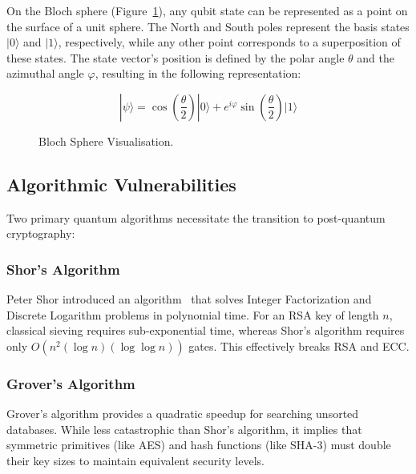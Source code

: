 On the Bloch sphere (Figure~\ref{fig:bloch_sphere_visualisation}), any qubit state can be represented as a point on the surface of a unit sphere.
The North and South poles represent the basis states $|0\rangle$ and $|1\rangle$, respectively, while any other point corresponds to a superposition of these states.
The state vector's position is defined by the polar angle $\theta$ and the azimuthal angle $\varphi$, resulting in the following representation:

\begin{equation}
    |\psi\rangle = \cos\left(\frac{\theta}{2}\right)|0\rangle + e^{i\varphi}\sin\left(\frac{\theta}{2}\right)|1\rangle
\end{equation}

\begin{figure}[htbp]
    \centering
    
    \caption{Bloch Sphere Visualisation. }
    \label{fig:bloch_sphere_visualisation}
\end{figure}

\subsection{Algorithmic Vulnerabilities}
\label{subsec:shor_and_grover}

Two primary quantum algorithms necessitate the transition to post-quantum cryptography:

\subsubsection{Shor's Algorithm}
Peter Shor introduced an algorithm~\cite{shor1994algorithms} that solves Integer Factorization and Discrete Logarithm problems in polynomial time.
For an RSA key of length $n$, classical sieving requires sub-exponential time, whereas Shor's algorithm requires only $O(n^2 (\log n) (\log \log n))$ gates.
This effectively breaks RSA and ECC.

\subsubsection{Grover's Algorithm}
Grover's algorithm provides a quadratic speedup for searching unsorted databases.
While less catastrophic than Shor's algorithm, it implies that symmetric primitives (like AES) and hash functions (like SHA-3) must double their key sizes to maintain equivalent security levels.


